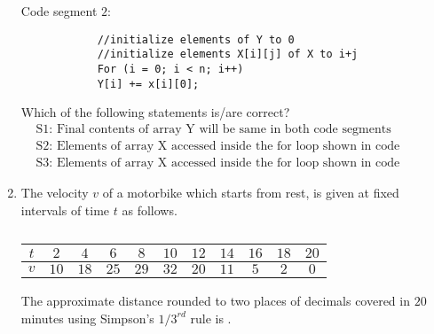 \documentclass[journal,12pt,onecolumn]{IEEEtran}
\theoremstyle{remark}
\begin{document}
\begin{enumerate}
		Code segment $2$:
		\begin{verbatim}
			//initialize elements of Y to 0
			//initialize elements X[i][j] of X to i+j
			For (i = 0; i < n; i++)
			Y[i] += x[i][0];
		\end{verbatim}
		
		Which of the following statements is/are correct?
		\begin{align*}
			&\text{S1: Final contents of array Y will be same in both code segments}\\
			&\text{S2: Elements of array X accessed inside the for loop shown in code segment 1 are contiguous in main memory}\\
			&\text{S3: Elements of array X accessed inside the for loop shown in code segment 2 are contiguous in main memory.}
		\end{align*}
		
		\hfill{}
		
		\begin{enumerate}
		\end{enumerate}
		
		\item The velocity $v$  of a motorbike which starts from rest, is given at fixed intervals of time $t$  as follows.
		
		\begin{table}[h]
			\centering
			\caption*{}
			\label{tab:velocity}
			\begin{tabular}{|c|c|c|c|c|c|c|c|c|c|c|}
				\hline
				$t$ & $2$ & $4$ & $6$ & $8$ & $10$ & $12$ & $14$ & $16$ & $18$ & $20$ \\
				\hline
				$v$ & $10$ & $18$ & $25$ & $29$ & $32$ & $20$ & $11$ & $5$ & $2$ & $0$ \\
				\hline
			\end{tabular}
		\end{table}
		
		The approximate distance  rounded to two places of decimals covered in $20$ minutes using Simpson's $1/3^{rd}$ rule is \underline{\hspace{2cm}}.
		

\end{enumerate}
\end{document}
